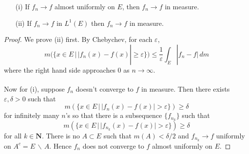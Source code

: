 \vspace{2ex}
\begin{thm}
\begin{itemize}
\item[(i)] If $f_{n}\rightarrow f$ almost uniformly on $E$, then $f_{n}\rightarrow f$ in measure.
\item[(ii)] If $f_{n}\rightarrow f$ in $L^{1}(E)$ then $f_{n}\rightarrow f$ in measure. 
\end{itemize}
\end{thm}
\vspace{2ex}
\begin{proof}
We prove (ii) first. By Chebychev, for each $\varepsilon $,
\[m(\{x\in E \,|\, |f_{n}(x)-f(x)|\geq \varepsilon \})\leq \dfrac{1}{\varepsilon } \int _{E}|f_{n}-f|\,dm\]
where the right hand side approaches $0$ as $n\rightarrow \infty $.
\\\\

Now for (i), suppose $f_{n}$ doesn't converge to $f$ in measure. Then there exists $\varepsilon ,\delta >0$ such that 
\[m(\{x\in E \,|\, |f_{n}(x)-f(x)|>\varepsilon \})\geq \delta \]
for infinitely many $n$'s so that there is a subsequence $\{f_{n_{k}}\}$ such that
\[m(\{x\in E \,|\,|f_{n_{k}}(x)-f(x)|>\varepsilon  \})\geq \delta \]
for all $k\in {\bm N}$. There is no $A\subset E$ such that $m(A)<\delta /2$ and $f_{n_{k}}\rightarrow f$ uniformly on $A^{c}=E\,\backslash\,A$. Hence $f_{n}$ does not converge to $f$ almost uniformly on $E$.
\end{proof}
\vspace{2ex}
